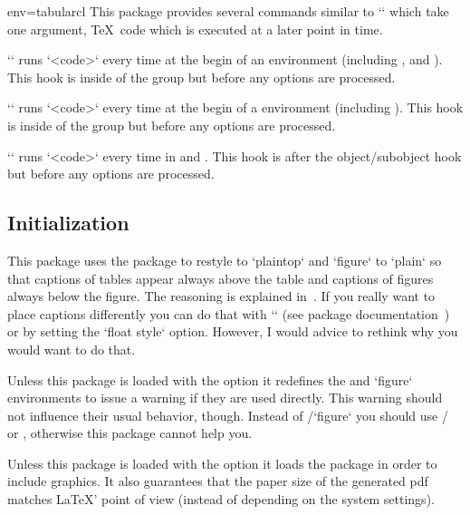 \begin{tableobject}{env=tabular}{cl}
This package provides several commands similar to `\AtBeginDocument`
which take one argument, \TeX\ code which is executed at a later point in time.


\DescribeMacro{\AtBeginObject}
``
  runs `<code>` every time at the begin of an  environment
  (including ,  and ).
  This hook is inside of the group but before any options are processed.

\DescribeMacro{\AtBeginSubobject}
``
  runs `<code>` every time at the begin of a  environment
  (including ).
  This hook is inside of the group but before any options are processed.

\DescribeMacro{\AtBeginGraphicObject}
``
  runs `<code>` every time in  and .
  This hook is after the object\slash subobject hook but before any options are processed.


\subsection{Initialization}
\label{initialization}

This package uses the  package to restyle  to `plaintop` and `figure` to `plain`
so that captions of tables appear always above the table and captions of figures always below the figure.
The reasoning is explained in~\autocite{texexchange_caption_position}.
If you really want to place captions differently you can do that with `\restylefloat` (see  package documentation~\autocite{float}) or by setting the `float style` option.
However, I would advice to rethink why you would want to do that.

Unless this package is loaded with the  option
it redefines the  and `figure` environments to issue a warning if they are used directly.
This warning should not influence their usual behavior, though.
Instead of \slash `figure` you should use \slash {} or ,
otherwise this package cannot help you.

Unless this package is loaded with the  option
it loads the  package in order to include graphics.
It also guarantees that the paper size of the generated pdf matches \LaTeX' point of view (instead of depending on the system settings).


\end{tableobject}
